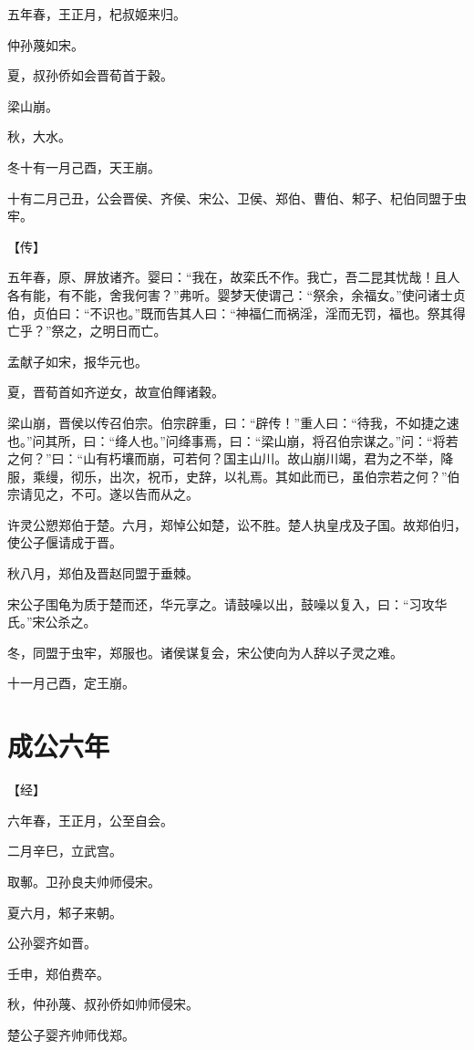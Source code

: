 \documentclass[a4paper,12pt,UTF8,twoside]{ctexbook}
\begin{document}
五年春，王正月，杞叔姬来归。

仲孙蔑如宋。

夏，叔孙侨如会晋荀首于穀。

梁山崩。

秋，大水。

冬十有一月己酉，天王崩。

十有二月己丑，公会晋侯、齐侯、宋公、卫侯、郑伯、曹伯、邾子、杞伯同盟于虫牢。

【传】

五年春，原、屏放诸齐。婴曰：“我在，故栾氏不作。我亡，吾二昆其忧哉！且人各有能，有不能，舍我何害？”弗听。婴梦天使谓己：“祭余，余福女。”使问诸士贞伯，贞伯曰：“不识也。”既而告其人曰：“神福仁而祸淫，淫而无罚，福也。祭其得亡乎？”祭之，之明日而亡。

孟献子如宋，报华元也。

夏，晋荀首如齐逆女，故宣伯餫诸穀。

梁山崩，晋侯以传召伯宗。伯宗辟重，曰：“辟传！”重人曰：“待我，不如捷之速也。”问其所，曰：“绛人也。”问绛事焉，曰：“梁山崩，将召伯宗谋之。”问：“将若之何？”曰：“山有朽壤而崩，可若何？国主山川。故山崩川竭，君为之不举，降服，乘缦，彻乐，出次，祝币，史辞，以礼焉。其如此而已，虽伯宗若之何？”伯宗请见之，不可。遂以告而从之。

许灵公愬郑伯于楚。六月，郑悼公如楚，讼不胜。楚人执皇戌及子国。故郑伯归，使公子偃请成于晋。



秋八月，郑伯及晋赵同盟于垂棘。

宋公子围龟为质于楚而还，华元享之。请鼓噪以出，鼓噪以复入，曰：“习攻华氏。”宋公杀之。

冬，同盟于虫牢，郑服也。诸侯谋复会，宋公使向为人辞以子灵之难。

十一月己酉，定王崩。


\section{成公六年}


【经】

六年春，王正月，公至自会。

二月辛巳，立武宫。

取鄟。卫孙良夫帅师侵宋。

夏六月，邾子来朝。

公孙婴齐如晋。

壬申，郑伯费卒。

秋，仲孙蔑、叔孙侨如帅师侵宋。

楚公子婴齐帅师伐郑。
\end{document}
